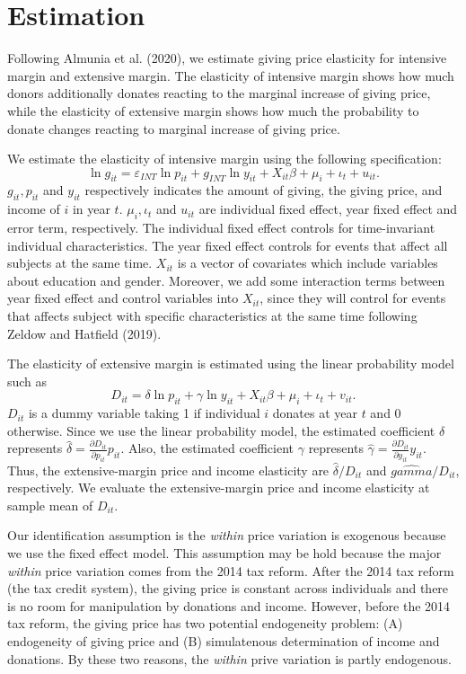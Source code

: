 \documentclass[ review  , 3p ]{elsarticle}
\begin{document}
  \hypertarget{estimation}{%
  \section{Estimation}\label{estimation}}

  Following Almunia et al. (2020), we estimate giving price elasticity for intensive margin and extensive margin. The elasticity of intensive margin shows how much donors additionally donates reacting to the marginal increase of giving price, while the elasticity of extensive margin shows how much the probability to donate changes reacting to marginal increase of giving price.

  We estimate the elasticity of intensive margin using the following specification:
  \[
  \ln g_{it} = \varepsilon_{INT} \ln p_{it} +g_{INT} \ln y_{it} + X_{it}\beta +\mu_i +\iota_t +u_{it}. \label{intensive}
  \]
  \(g_{it}, p_{it}\) and \(y_{it}\) respectively indicates the amount of giving, the giving price, and income of \(i\) in year \(t\). \(\mu_i, \iota_t\) and \(u_{it}\) are individual fixed effect, year fixed effect and error term, respectively.
  The individual fixed effect controls for time-invariant individual characteristics. The year fixed effect controls for events that affect all subjects at the same time. \(X_{it}\) is a vector of covariates which include variables about education and gender. Moreover, we add some interaction terms between year fixed effect and control variables into \(X_{it}\), since they will control for events that affects subject with specific characteristics at the same time following Zeldow and Hatfield (2019).

  The elasticity of extensive margin is estimated using the linear probability model such as
  \[
  D_{it} =  \delta \ln p_{it} +\gamma \ln y_{it} + X_{it}\beta+\mu_i  +\iota_t +v_{it}. \label{extensive}
  \]
  \(D_{it}\) is a dummy variable taking 1 if individual \(i\) donates at year \(t\) and 0 otherwise.
  \color{red}
  Since we use the linear probability model,
  the estimated coefficient \(\delta\) represents \(\hat{\delta} = \frac{\partial D_{it}}{\partial p_{it}} p_{it}\).
  Also, the estimated coefficient \(\gamma\) represents \(\hat{\gamma} = \frac{\partial D_{it}}{\partial y_{it}} y_{it}\).
  Thus, the extensive-margin price and income elasticity are \(\hat{\delta}/D_{it}\) and \(\hat{gamma}/D_{it}\), respectively.
  We evaluate the extensive-margin price and income elasticity at sample mean of \(D_{it}\).

  Our identification assumption is the \emph{within} price variation is exogenous because we use the fixed effect model.
  This assumption may be hold because the major \emph{within} price variation comes from the 2014 tax reform.
  After the 2014 tax reform (the tax credit system), the giving price is constant across individuals and
  there is no room for manipulation by donations and income.
  However, before the 2014 tax reform, the giving price has two potential endogeneity problem:
  (A) endogeneity of giving price and (B) simulatenous determination of income and donations.
  By these two reasons, the \emph{within} prive variation is partly endogenous.
\end{document}
